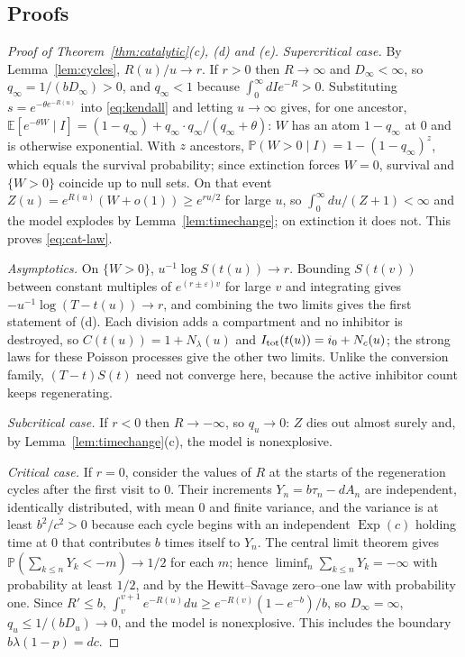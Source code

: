 \documentclass[11pt,a4paper]{article}
\numberwithin{equation}{section}
\theoremstyle{definition}\newtheorem{definition}[theorem]{Definition}
\theoremstyle{remark}\newtheorem{remark}[theorem]{Remark}\newtheorem{example}[theorem]{Example}
\newcommand{\E}{\mathbb E}
\renewcommand{\P}{\mathbb P}
\newcommand{\Exp}{\operatorname{Exp}}
\begin{document}
\subsection{Proofs}\label{sec:cat-proofs}
\begin{proof}[Proof of Theorem~\ref{thm:catalytic}(c), (d) and (e)]
\emph{Supercritical case.} By Lemma~\ref{lem:cycles}, $R(u)/u\to r$. If $r>0$ then $R\to\infty$ and $D_\infty<\infty$, so $q_\infty=1/(bD_\infty)>0$, and $q_\infty<1$ because $\int_0^\infty dIe^{-R}>0$. Substituting $s=e^{-\theta e^{-R(u)}}$ into \eqref{eq:kendall} and letting $u\to\infty$ gives, for one ancestor, $\E[e^{-\theta W}\mid I]=(1-q_\infty)+q_\infty\cdot q_\infty/(q_\infty+\theta)$: $W$ has an atom $1-q_\infty$ at $0$ and is otherwise exponential. With $z$ ancestors, $\P(W>0\mid I)=1-(1-q_\infty)^z$, which equals the survival probability; since extinction forces $W=0$, survival and $\{W>0\}$ coincide up to null sets. On that event $Z(u)=e^{R(u)}(W+o(1))\ge e^{ru/2}$ for large $u$, so $\int_0^\infty du/(Z+1)<\infty$ and the model explodes by Lemma~\ref{lem:timechange}; on extinction it does not. This proves \eqref{eq:cat-law}.

\emph{Asymptotics.} On $\{W>0\}$, $u^{-1}\log S(t(u))\to r$. Bounding $S(t(v))$ between constant multiples of $e^{(r\pm\varepsilon)v}$ for large $v$ and integrating gives $-u^{-1}\log(T-t(u))\to r$, and combining the two limits gives the first statement of (d). Each division adds a compartment and no inhibitor is destroyed, so $C(t(u))=1+N_\lambda(u)$ and $I_{\rm tot}(t(u))=i_0+N_c(u)$; the strong laws for these Poisson processes give the other two limits. Unlike the conversion family, $(T-t)S(t)$ need not converge here, because the active inhibitor count keeps regenerating.

\emph{Subcritical case.} If $r<0$ then $R\to-\infty$, so $q_u\to0$: $Z$ dies out almost surely and, by Lemma~\ref{lem:timechange}(c), the model is nonexplosive.

\emph{Critical case.} If $r=0$, consider the values of $R$ at the starts of the regeneration cycles after the first visit to $0$. Their increments $Y_n=b\tau_n-dA_n$ are independent, identically distributed, with mean $0$ and finite variance, and the variance is at least $b^2/c^2>0$ because each cycle begins with an independent $\Exp(c)$ holding time at $0$ that contributes $b$ times itself to $Y_n$. The central limit theorem gives $\P(\sum_{k\le n}Y_k<-m)\to1/2$ for each $m$; hence $\liminf_n\sum_{k\le n}Y_k=-\infty$ with probability at least $1/2$, and by the Hewitt--Savage zero--one law with probability one. Since $R'\le b$, $\int_v^{v+1}e^{-R(u)}du\ge e^{-R(v)}(1-e^{-b})/b$, so $D_\infty=\infty$, $q_u\le1/(bD_u)\to0$, and the model is nonexplosive. This includes the boundary $b\lambda(1-p)=dc$.
\end{proof}
\end{document}
